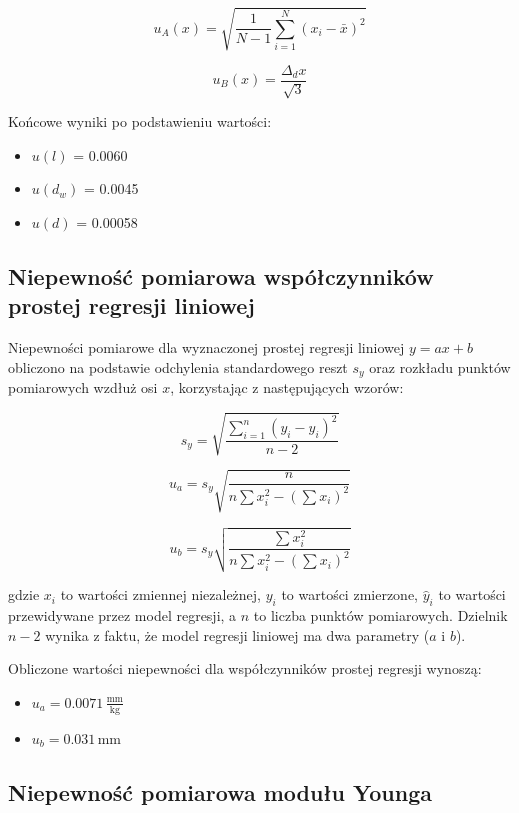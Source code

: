 \documentclass[a4paper,12pt]{article}
\begin{document}
\begin{equation}
\label{eq:u_A}
u_A(x) = \sqrt{\frac{1}{N-1} \sum_{i=1}^{N} (x_i - \bar{x})^2}
\end{equation}

\begin{equation}
\label{eq:u_B}
u_B(x) = \frac{\Delta_d x}{\sqrt{3}}
\end{equation}

Końcowe wyniki po podstawieniu wartości:

\begin{itemize}
\item $u(l)$ = 0.0060\,
\item $u(d_w)$ = 0.0045 
\item $u(d)$ = 0.00058\,
\end{itemize}



\subsection{Niepewność pomiarowa współczynników prostej regresji liniowej}

Niepewności pomiarowe dla wyznaczonej prostej regresji liniowej $y = ax + b$ obliczono na podstawie odchylenia standardowego reszt $s_y$ oraz rozkładu punktów pomiarowych wzdłuż osi $x$, korzystając z następujących wzorów:

\[
s_y = \sqrt{\frac{\sum_{i=1}^{n} (y_i - \hat{y}_i)^2}{n-2}}
\]

\[
u_a = s_y \sqrt{\frac{n}{n \sum x_i^2 - \left( \sum x_i \right)^2}}
\]

\[
u_b = s_y \sqrt{\frac{\sum x_i^2}{n \sum x_i^2 - \left( \sum x_i \right)^2}}
\]

gdzie $x_i$ to wartości zmiennej niezależnej, $y_i$ to wartości zmierzone, $\hat{y}_i$ to wartości przewidywane przez model regresji, a $n$ to liczba punktów pomiarowych. Dzielnik $n-2$ wynika z faktu, że model regresji liniowej ma dwa parametry ($a$ i $b$).


Obliczone wartości niepewności dla współczynników prostej regresji wynoszą:

\begin{itemize}
    \item $u_a = 0.0071\,\frac{\text{mm}}{\text{kg}}$
    \item $u_b = 0.031\,\text{mm}$
\end{itemize}

\subsection{Niepewność pomiarowa modułu Younga}
\end{document}
